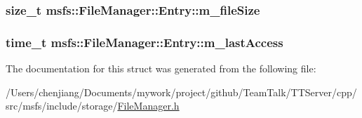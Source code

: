 \subsubsection[{m\+\_\+file\+Size}]{\setlength{\rightskip}{0pt plus 5cm}size\+\_\+t msfs\+::\+File\+Manager\+::\+Entry\+::m\+\_\+file\+Size}\label{structmsfs_1_1_file_manager_1_1_entry_af47e284f91ae90e903f687b3013e2b93}
\hypertarget{structmsfs_1_1_file_manager_1_1_entry_a97f8e8407f5b4a7ee0d0f06d9b166510}{}
\subsubsection[{m\+\_\+last\+Access}]{\setlength{\rightskip}{0pt plus 5cm}time\+\_\+t msfs\+::\+File\+Manager\+::\+Entry\+::m\+\_\+last\+Access}\label{structmsfs_1_1_file_manager_1_1_entry_a97f8e8407f5b4a7ee0d0f06d9b166510}


The documentation for this struct was generated from the following file\+:\begin{DoxyCompactItemize}
\item 
/\+Users/chenjiang/\+Documents/mywork/project/github/\+Team\+Talk/\+T\+T\+Server/cpp/src/msfs/include/storage/\hyperlink{_file_manager_8h}{File\+Manager.\+h}\end{DoxyCompactItemize}
